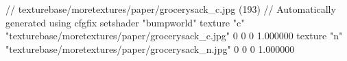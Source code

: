 // texturebase/moretextures/paper/grocerysack_c.jpg (193)
// Automatically generated using cfgfix
setshader "bumpworld"
texture "c" "texturebase/moretextures/paper/grocerysack_c.jpg" 0 0 0 1.000000
texture "n" "texturebase/moretextures/paper/grocerysack_n.jpg" 0 0 0 1.000000

